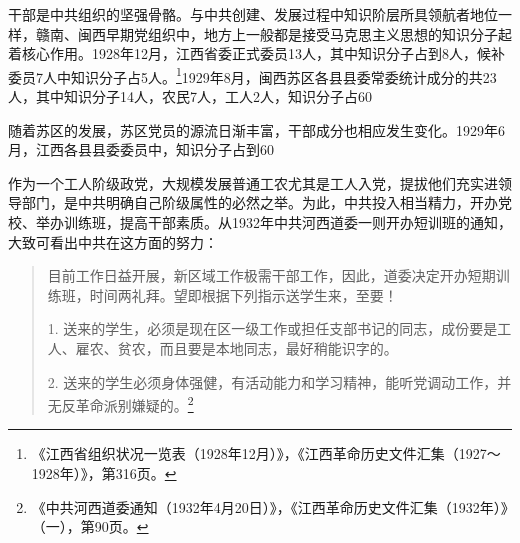 干部是中共组织的坚强骨骼。与中共创建、发展过程中知识阶层所具领航者地位一样，赣南、闽西早期党组织中，地方上一般都是接受马克思主义思想的知识分子起着核心作用。1928年12月，江西省委正式委员13人，其中知识分子占到8人，候补委员7人中知识分子占5人。\footnote{《江西省组织状况一览表（1928年12月）》，《江西革命历史文件汇集（1927～1928年）》，第316页。}1929年8月，闽西苏区各县县委常委统计成分的共23人，其中知识分子14人，农民7人，工人2人，知识分子占60%


随着苏区的发展，苏区党员的源流日渐丰富，干部成分也相应发生变化。1929年6月，江西各县县委委员中，知识分子占到60%


作为一个工人阶级政党，大规模发展普通工农尤其是工人入党，提拔他们充实进领导部门，是中共明确自己阶级属性的必然之举。为此，中共投入相当精力，开办党校、举办训练班，提高干部素质。从1932年中共河西道委一则开办短训班的通知，大致可看出中共在这方面的努力：

\begin{quote}

目前工作日益开展，新区域工作极需干部工作，因此，道委决定开办短期训练班，时间两礼拜。望即根据下列指示送学生来，至要！

1. 送来的学生，必须是现在区一级工作或担任支部书记的同志，成份要是工人、雇农、贫农，而且要是本地同志，最好稍能识字的。

2. 送来的学生必须身体强健，有活动能力和学习精神，能听党调动工作，并无反革命派别嫌疑的。\footnote{《中共河西道委通知（1932年4月20日）》，《江西革命历史文件汇集（1932年）》（一），第90页。}
\end{quote}



